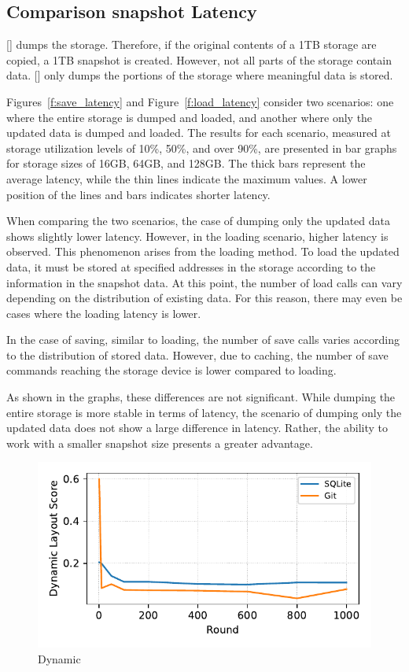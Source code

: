 
\subsection{Comparison snapshot Latency}
[] dumps the storage. 
Therefore, if the original contents of a 1TB storage are copied, a 1TB snapshot is created. 
However, not all parts of the storage contain data. 
[] only dumps the portions of the storage where meaningful data is stored.

Figures~\ref{f:save_latency} and Figure~\ref{f:load_latency} consider two scenarios: one where the entire storage is dumped and loaded, and another where only the updated data is dumped and loaded. 
The results for each scenario, measured at storage utilization levels of 10\%, 50\%, and over 90\%, are presented in bar graphs for storage sizes of 16GB, 64GB, and 128GB. 
The thick bars represent the average latency, while the thin lines indicate the maximum values. 
A lower position of the lines and bars indicates shorter latency.

When comparing the two scenarios, the case of dumping only the updated data shows slightly lower latency. 
However, in the loading scenario, higher latency is observed. This phenomenon arises from the loading method. 
To load the updated data, it must be stored at specified addresses in the storage according to the information in the snapshot data. 
At this point, the number of load calls can vary depending on the distribution of existing data. 
For this reason, there may even be cases where the loading latency is lower.

In the case of saving, similar to loading, the number of save calls varies according to the distribution of stored data. 
However, due to caching, the number of save commands reaching the storage device is lower compared to loading.

As shown in the graphs, these differences are not significant. 
While dumping the entire storage is more stable in terms of latency, the scenario of dumping only the updated data does not show a large difference in latency. 
Rather, the ability to work with a smaller snapshot size presents a greater advantage.


\begin{figure}[t]
    \centering
    \includegraphics[width=0.95\columnwidth]{graphs/py_graph/dynamic}
    \caption{Dynamic}
    \label{f:dynamic}
\end{figure}


